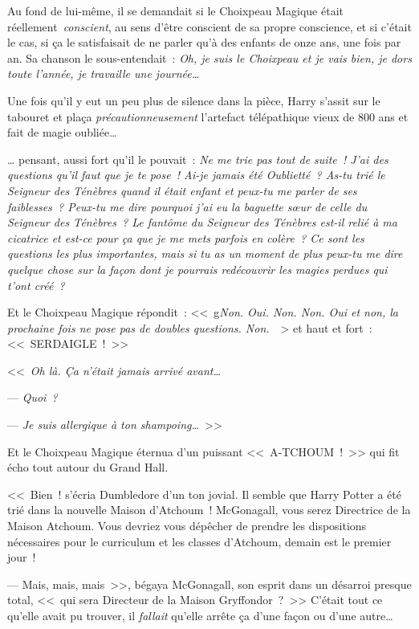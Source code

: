 \later

Au fond de lui-même, il se demandait si le Choixpeau Magique était réellement~\emph{conscient}, au sens d'être conscient de sa propre conscience, et si c'était le cas, si ça le satisfaisait de ne parler qu'à des enfants de onze ans, une fois par an. Sa chanson le sous-entendait~: \emph{Oh, je suis le Choixpeau et je vais bien, je dors toute l'année, je travaille une journée…}

Une fois qu'il y eut un peu plus de silence dans la pièce, Harry s'assit sur le tabouret et plaça \emph{précautionneusement} l'artefact télépathique vieux de 800 ans et fait de magie oubliée…

… pensant, aussi fort qu'il le pouvait~: \emph{Ne me trie pas tout de suite~! J'ai des questions qu'il faut que je te pose~! Ai-je jamais été Oublietté~? As-tu trié le Seigneur des Ténèbres quand il était enfant et peux-tu me parler de ses faiblesses~? Peux-tu me dire pourquoi j'ai eu la baguette sœur de celle du Seigneur des Ténèbres~? Le fantôme du Seigneur des Ténèbres est-il relié à ma cicatrice et est-ce pour ça que je me mets parfois en colère~? Ce sont les questions les plus importantes, mais si tu as un moment de plus peux-tu me dire quelque chose sur la façon dont je pourrais redécouvrir les magies perdues qui t'ont créé~?}

Et le Choixpeau Magique répondit~: <<~g\emph{Non. Oui. Non. Non. Oui et non, la prochaine fois ne pose pas de doubles questions. Non.}~~> et haut et fort~: <<~SERDAIGLE~!~>>

\later

<<~\emph{Oh là. Ça n'était jamais arrivé avant…}

--- \emph{Quoi~?}

--- \emph{Je suis allergique à ton shampoing…}~>>

Et le Choixpeau Magique éternua d'un puissant <<~A-TCHOUM~!~>> qui fit écho tout autour du Grand Hall.

<<~Bien~! s'écria Dumbledore d'un ton jovial. Il semble que Harry Potter a été trié dans la nouvelle Maison d'Atchoum~! McGonagall, vous serez Directrice de la Maison Atchoum. Vous devriez vous dépêcher de prendre les dispositions nécessaires pour le curriculum et les classes d'Atchoum, demain est le premier jour~!

--- Mais, mais, mais~>>, bégaya McGonagall, son esprit dans un désarroi presque total, <<~qui sera Directeur de la Maison Gryffondor~?~>> C'était tout ce qu'elle avait pu trouver, il \emph{fallait} qu'elle arrête ça d'une façon ou d'une autre…

